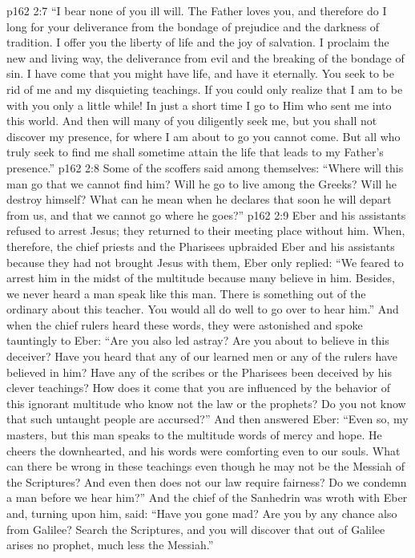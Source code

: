 \vs p162 2:7 \textcolor{ubdarkred}{“I bear none of you ill will. The Father loves you, and therefore do I long for your deliverance from the bondage of prejudice and the darkness of tradition. I offer you the liberty of life and the joy of salvation. I proclaim the new and living way, the deliverance from evil and the breaking of the bondage of sin. I have come that you might have life, and have it eternally. You seek to be rid of me and my disquieting teachings. If you could only realize that I am to be with you only a little while! In just a short time I go to Him who sent me into this world. And then will many of you diligently seek me, but you shall not discover my presence, for where I am about to go you cannot come. But all who truly seek to find me shall sometime attain the life that leads to my Father’s presence.”}
\vs p162 2:8 Some of the scoffers said among themselves: “Where will this man go that we cannot find him? Will he go to live among the Greeks? Will he destroy himself? What can he mean when he declares that soon he will depart from us, and that we cannot go where he goes?”
\vs p162 2:9 Eber and his assistants refused to arrest Jesus; they returned to their meeting place without him. When, therefore, the chief priests and the Pharisees upbraided Eber and his assistants because they had not brought Jesus with them, Eber only replied: “We feared to arrest him in the midst of the multitude because many believe in him. Besides, we never heard a man speak like this man. There is something out of the ordinary about this teacher. You would all do well to go over to hear him.” And when the chief rulers heard these words, they were astonished and spoke tauntingly to Eber: “Are you also led astray? Are you about to believe in this deceiver? Have you heard that any of our learned men or any of the rulers have believed in him? Have any of the scribes or the Pharisees been deceived by his clever teachings? How does it come that you are influenced by the behavior of this ignorant multitude who know not the law or the prophets? Do you not know that such untaught people are accursed?” And then answered Eber: “Even so, my masters, but this man speaks to the multitude words of mercy and hope. He cheers the downhearted, and his words were comforting even to our souls. What can there be wrong in these teachings even though he may not be the Messiah of the Scriptures? And even then does not our law require fairness? Do we condemn a man before we hear him?” And the chief of the Sanhedrin was wroth with Eber and, turning upon him, said: “Have you gone mad? Are you by any chance also from Galilee? Search the Scriptures, and you will discover that out of Galilee arises no prophet, much less the Messiah.”\plusone
